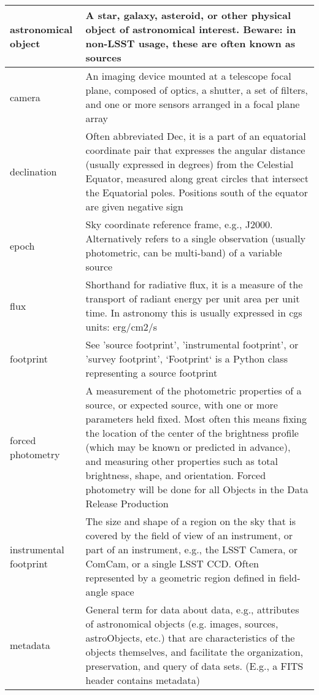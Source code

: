 \begin{longtable}{|p{}|p{}|}
astronomical object & A star, galaxy, asteroid, or other physical object of astronomical interest. Beware: in non-LSST usage, these are often known as sources \\\hline
camera & An imaging device mounted at a telescope focal plane, composed of optics, a shutter, a set of filters, and one or more sensors arranged in a focal plane array \\\hline
declination & Often abbreviated Dec, it is a part of an equatorial coordinate pair that expresses the angular distance (usually expressed in degrees) from the Celestial Equator, measured along great circles that intersect the Equatorial poles. Positions south of the equator are given negative sign \\\hline
epoch & Sky coordinate reference frame, e.g., J2000. Alternatively refers to a single observation (usually photometric, can be multi-band) of a variable source \\\hline
flux & Shorthand for radiative \gls{flux}, it is a measure of the transport of radiant energy per unit area per unit time. In astronomy this is usually expressed in cgs units: erg/cm2/s \\\hline
footprint & See 'source \gls{footprint}', 'instrumental \gls{footprint}', or 'survey \gls{footprint}', `Footprint` is a Python class representing a source \gls{footprint} \\\hline
forced photometry & A measurement of the photometric properties of a source, or expected source, with one or more parameters held fixed. Most often this means fixing the location of the center of the brightness profile (which may be known or predicted in advance), and measuring other properties such as total brightness, \gls{shape}, and orientation. Forced photometry will be done for all Objects in the \gls{Data Release Production} \\\hline
instrumental \gls{footprint} & The size and \gls{shape} of a region on the sky that is covered by the field of view of an instrument, or part of an instrument, e.g., the \gls{LSST} \gls{Camera}, or ComCam, or a single \gls{LSST} \gls{CCD}.  Often represented by a geometric region defined in field-angle space \\\hline
metadata & General term for data about data, e.g., attributes of astronomical objects (e.g. images, sources, astroObjects, etc.) that are characteristics of the objects themselves, and facilitate the organization, preservation, and query of data sets. (E.g., a \gls{FITS} header contains \gls{metadata}) \\\hline

\end{longtable}
